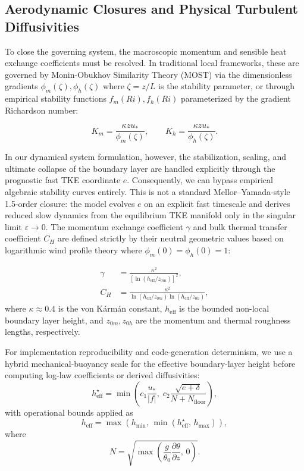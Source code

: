 \documentclass[11pt,letterpaper]{article}
\begin{document}
\subsection{Aerodynamic Closures and Physical Turbulent Diffusivities}
\label{subsec:micro_closures}

To close the governing system, the macroscopic momentum and sensible heat exchange coefficients must be resolved. In traditional local frameworks, these are governed by Monin-Obukhov Similarity Theory (MOST) via the dimensionless gradients $\phi_m(\zeta), \phi_h(\zeta)$ where $\zeta = z/L$ is the stability parameter, or through empirical stability functions $f_m(Ri), f_h(Ri)$ parameterized by the gradient Richardson number:

\begin{equation}
K_m = \frac{\kappa z u_*}{\phi_m(\zeta)}, \qquad K_h = \frac{\kappa z u_*}{\phi_h(\zeta)}.
\end{equation}

In our dynamical system formulation, however, the stabilization, scaling, and ultimate collapse of the boundary layer are handled explicitly through the prognostic fast TKE coordinate $e$. Consequently, we can bypass empirical algebraic stability curves entirely. This is not a standard Mellor--Yamada-style 1.5-order closure: the model evolves $e$ on an explicit fast timescale and derives reduced slow dynamics from the equilibrium TKE manifold only in the singular limit $\varepsilon \to 0$. The momentum exchange coefficient $\gamma$ and bulk thermal transfer coefficient $C_H$ are defined strictly by their neutral geometric values based on logarithmic wind profile theory where $\phi_m(0) = \phi_h(0) = 1$:

\begin{align}
\gamma &= \frac{\kappa^2}{\left[ \ln(h_{\mathrm{eff}} / z_{0m}) \right]^2}, \\
C_H &= \frac{\kappa^2}{\ln(h_{\mathrm{eff}} / z_{0m}) \ln(h_{\mathrm{eff}} / z_{0h})},
\end{align}
where $\kappa \approx 0.4$ is the von Kármán constant, $h_{\mathrm{eff}}$ is the bounded non-local boundary layer height, and $z_{0m}, z_{0h}$ are the momentum and thermal roughness lengths, respectively.

For implementation reproducibility and code-generation determinism, we use a hybrid mechanical-buoyancy scale for the effective boundary-layer height before computing log-law coefficients or derived diffusivities:
\begin{equation}
h_{\mathrm{eff}}^{\star} = \min\left(c_1\frac{u_*}{|f|},\; c_2\frac{\sqrt{e+\delta}}{N + N_{\mathrm{floor}}}\right),
\label{eq:closure_h_hybrid}
\end{equation}
with operational bounds applied as
\begin{equation}
h_{\mathrm{eff}} = \max\left(h_{\min},\, \min\left(h_{\mathrm{eff}}^{\star},\, h_{\max}\right)\right),
\label{eq:closure_h_clamp}
\end{equation}
where
\begin{equation}
N = \sqrt{\max\left(\frac{g}{\theta_0}\frac{\partial \theta}{\partial z},\,0\right)}.
\end{equation}
\end{document}

